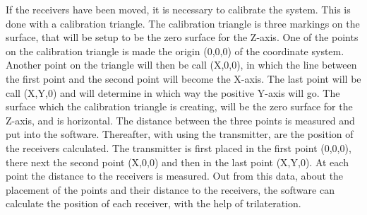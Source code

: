 If the receivers have been moved, it is necessary to calibrate the system. This is done with a calibration triangle. The calibration triangle is three markings on the surface, that will be setup to be the zero surface for the Z-axis. One of the points on the calibration triangle is made the origin (0,0,0) of the coordinate system. Another point on the triangle will then be call (X,0,0), in which the line between the first point and the second point will become the X-axis. The last point will be call (X,Y,0) and will determine in which way the positive Y-axis will go. The surface which the calibration triangle is creating, will be the zero surface for the Z-axis, and is horizontal. The distance between the three points is measured and put into the software. Thereafter, with using the transmitter, are the position of the receivers calculated.  The transmitter is first placed in the first point (0,0,0), there next the second point (X,0,0) and then in the last point (X,Y,0). At each point the distance to the receivers is measured. Out from this data, about the placement of the points and their distance to the receivers, the software can calculate the position of each receiver, with the help of trilateration. \\\\


